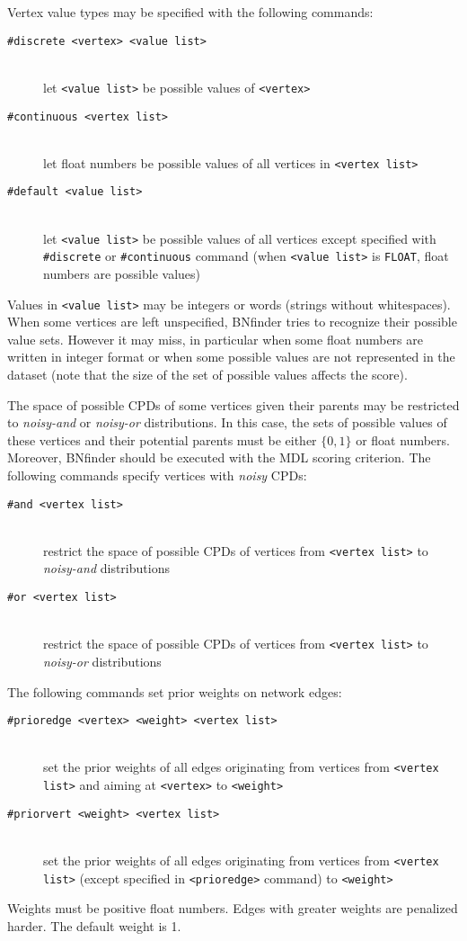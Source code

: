  Vertex value types may be specified with the following commands:
\begin{description}
\item[\texttt{\#discrete <vertex> <value list>}]~\\
 let \texttt{<value list>} be possible values of \texttt{<vertex>}
\item[\texttt{\#continuous <vertex list>}]~\\
 let float numbers be possible values of all vertices in \texttt{<vertex list>}
\item[\texttt{\#default <value list>}]~\\
 let \texttt{<value list>} be possible values of all vertices except specified with \texttt{\#discrete} or \texttt{\#continuous} command (when \texttt{<value list>} is \texttt{FLOAT}, float numbers are possible values)
\end{description}
 Values in \texttt{<value list>} may be integers or words (strings without whitespaces).
 When some vertices are left unspecified, BNfinder tries to recognize their possible value sets.
 However it may miss, in particular when some float numbers are written in integer format or when some possible values are not represented in the dataset (note that the size of the set of possible values affects the score).
 
 The space of possible CPDs of some vertices given their parents may be restricted to \emph{noisy-and} or \emph{noisy-or} distributions.
 In this case, the sets of possible values of these vertices and their potential parents must be either $\{0,1\}$ or float numbers.
 Moreover, BNfinder should be executed with the MDL scoring criterion.
 The following commands specify vertices with \emph{noisy} CPDs:
\begin{description}
\item[\texttt{\#and <vertex list>}]~\\
 restrict the space of possible CPDs of vertices from \texttt{<vertex list>} to \emph{noisy-and} distributions
\item[\texttt{\#or <vertex list>}]~\\
 restrict the space of possible CPDs of vertices from \texttt{<vertex list>} to \emph{noisy-or} distributions
\end{description}

 The following commands set prior weights on network edges:
\begin{description}
\item[\texttt{\#prioredge <vertex> <weight> <vertex list>}]~\\
 set the prior weights of all edges originating from vertices from \texttt{<vertex list>} and aiming at \texttt{<vertex>} to \texttt{<weight>}
\item[\texttt{\#priorvert <weight> <vertex list>}]~\\
 set the prior weights of all edges originating from vertices from \texttt{<vertex list>} (except specified in \texttt{<prioredge>} command) to \texttt{<weight>}
\end{description}
 Weights must be positive float numbers.
 Edges with greater weights are penalized harder.
 The default weight is 1.

